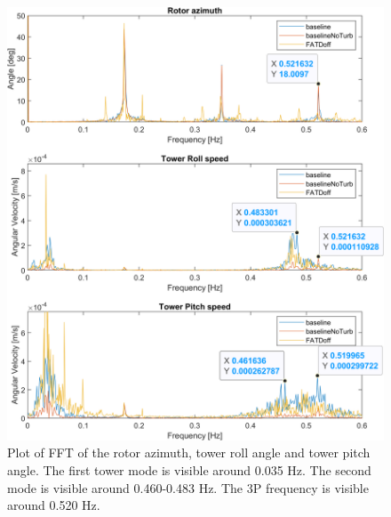 \begin{figure}[ht]
	\centering
	\includegraphics[width=0.8\linewidth]{Graphics/TestResults/tj01/PSIxVelyVelFFT.png}
	\caption{Plot of FFT of the rotor azimuth, tower roll angle and tower pitch angle. The first tower mode is visible around 0.035 Hz. The second mode is visible around 0.460-0.483 Hz. The 3P frequency is visible around 0.520 Hz.}
	\label{fig:tj1_PSIxVelyVelFFT}
\end{figure}
